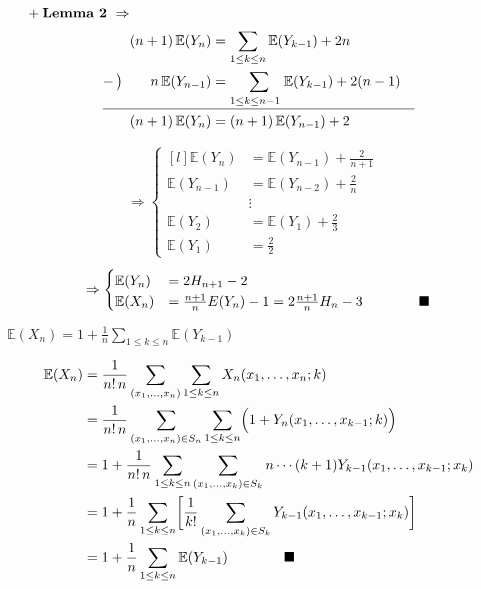 \documentclass[11pt,fleqn]{article}
\begin{document}
\noindent $\phantom{(1)}+ {\bf Lemma\ 2}\ \Rightarrow$
\begin{align*}
(n+1)\,\mathbb{E}(Y_n)&=\sum\limits_{1\le k\le n}\mathbb{E}(Y_{k-1})+2n&\\
-\,\bigl)\qquad n\,\mathbb{E}(Y_{n-1})
	&=\sum\limits_{1\le k\le n-1 \phantom{{1\over1}}}
		\!\!\!\mathbb{E}(Y_{k-1})+2(n-1)&\\
\hline
(n+1)\,\mathbb{E}(Y_n) &= (n+1)\,\mathbb{E}(Y_{n-1}) + 2 \phantom{\Bigl]}
\end{align*}
\begin{align*}
\Rightarrow
		\left\{\begin{matrix*}[l]		
		\mathbb{E}(Y_n) &=\mathbb{E}(Y_{n-1}) + \frac{2}{n+1} \\
		\mathbb{E}(Y_{n-1}) &=\mathbb{E}(Y_{n-2}) + \frac{2}{n} \\
			 & \vdots &\\
			\mathbb{E}(Y_2) &=\mathbb{E}(Y_1) + \frac{2}{3}\\
			\mathbb{E}(Y_1) &= \frac{2}{2}
\end{matrix*}\right.
\end{align*}
\begin{align*}
	\Rightarrow
		\left\{\begin{matrix*}[l]
			\mathbb{E}(Y_n) &= 2 H_{n+1} - 2 \phantom{\Bigl]} \\
			\mathbb{E}(X_n) &=\frac{n+1}{n}E(Y_{n})-1=2\frac{n+1}{n} H_n - 3
		\qquad\qquad\blacksquare
		\end{matrix*}\right.
\end{align*}

$\displaystyle\mathbb{E}(X_n)=1+\frac{1}{n}\sum\limits_{1\le k\le n} \mathbb{E}(Y_{k-1})$

\begin{align*}
\mathbb{E}(X_n) 
	&= \frac{1}{n!\,n} \sum\limits_{(x_1, \ldots, x_n)} 
		\sum_{1 \le k \le n} X_n (x_1, \ldots, x_n ; k) \\
	&= \frac{1}{n!\,n} \sum\limits_{(x_1, \ldots, x_n) \in S_n}
		\sum\limits_{1\le k\le n}\Bigl(1+Y_n(x_1,\ldots,x_{k-1} ; k)\Bigl)\\
	&= 1 + \frac{1}{n!\,n} \sum\limits_{1 \le k \le n}
		\sum\limits_{(x_1, \ldots, x_{k}) \in S_k} 
			n \cdots (k+1) Y_{k-1} (x_1, \ldots, x_{k-1}; x_k) \\
	&= 1 + \frac{1}{n} \sum\limits_{1 \le k \le n}
		\biggl[\frac{1}{k!}\sum\limits_{(x_1, \ldots, x_{k}) \in S_k} 
			Y_{k-1} (x_1, \ldots, x_{k-1}; x_k)\biggr] \\
	&= 1 + \frac{1}{n} \sum\limits_{1 \le k \le n}\mathbb{E}(Y_{k-1})
	\qquad\qquad\blacksquare
\end{align*}
\end{document}

